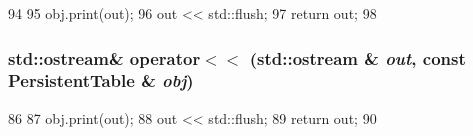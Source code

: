 \begin{DoxyCode}
94 {
95     obj.print(out);
96     out << std::flush;
97     return out;
98 }
\end{DoxyCode}
\hypertarget{PersistentTable_8hh_acaf9bf6abaa13b0eefc4a75a2f15886a}{
\subsubsection[{operator$<$$<$}]{\setlength{\rightskip}{0pt plus 5cm}std::ostream\& operator$<$$<$ (std::ostream \& {\em out}, \/  const {\bf PersistentTable} \& {\em obj})}}
\label{PersistentTable_8hh_acaf9bf6abaa13b0eefc4a75a2f15886a}



\begin{DoxyCode}
86 {
87     obj.print(out);
88     out << std::flush;
89     return out;
90 }
\end{DoxyCode}
